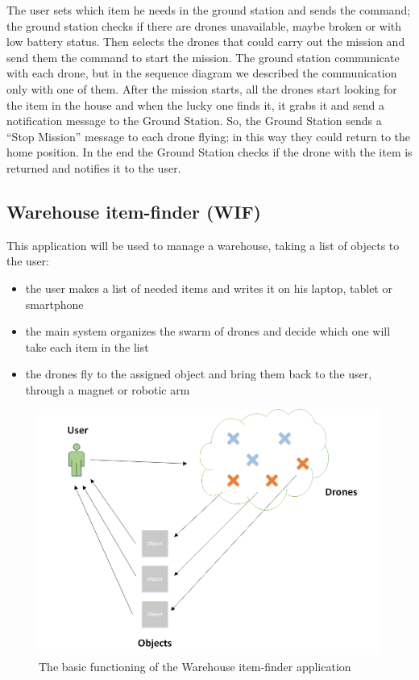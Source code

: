The user sets which item he needs in the ground station and sends the command; the ground station checks if there are drones unavailable, maybe broken or with low battery status. Then selects the drones that could carry out the mission and send them the command to start the mission. The ground station communicate with each drone, but in the sequence diagram we described the communication only with one of them. After the mission starts, all the drones start looking for the item in the house and when the lucky one finds it, it grabs it and send a notification message to the Ground Station. So, the Ground Station sends a “Stop Mission” message to each drone flying; in this way they could return to the home position. In the end the Ground Station checks if the drone with the item is returned and notifies it to the user.

\newpage

\subsection{Warehouse item-finder (WIF)}

This application will be used to manage a warehouse, taking a list of objects to the user:

\begin{itemize}
\itemsep2pt
\item{
the user makes a list of needed items and writes it on his laptop, tablet or smartphone}
\item{
the main system organizes the swarm of drones and decide which one will take each item in the list
}
\item{
the drones fly to the assigned object and bring them back to the user, through a magnet or robotic arm
}

\end{itemize}


\begin{figure}[H]
  \centering
  \includegraphics[width=\linewidth]{pictures/WIF.png}
  \caption{The basic functioning of the Warehouse item-finder application}
  \label{fig:WIS}
\end{figure}


